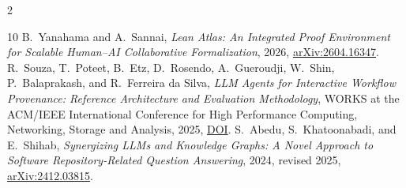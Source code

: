\documentclass[11pt]{article}
\begin{document}
{\begin{multicols}{2}
\begin{thebibliography}{10}
 B.~Yanahama and A.~Sannai, \emph{Lean Atlas: An
Integrated Proof Environment for Scalable Human--AI Collaborative
Formalization}, 2026,
\href{https://doi.org/10.48550/arXiv.2604.16347}{arXiv:2604.16347}.
 R.~Souza, T.~Poteet, B.~Etz, D.~Rosendo,
A.~Gueroudji, W.~Shin, P.~Balaprakash, and R.~Ferreira da Silva,
\emph{LLM Agents for Interactive Workflow Provenance: Reference Architecture
and Evaluation Methodology}, WORKS at the ACM/IEEE International Conference
for High Performance Computing, Networking, Storage and Analysis, 2025,
\href{https://doi.org/10.1145/3731599.3767582}{DOI}.
 S.~Abedu, S.~Khatoonabadi, and E.~Shihab,
\emph{Synergizing LLMs and Knowledge Graphs: A Novel Approach to Software
Repository-Related Question Answering}, 2024, revised 2025,
\href{https://arxiv.org/abs/2412.03815}{arXiv:2412.03815}.
\end{thebibliography}
\end{multicols}
}
\end{document}
